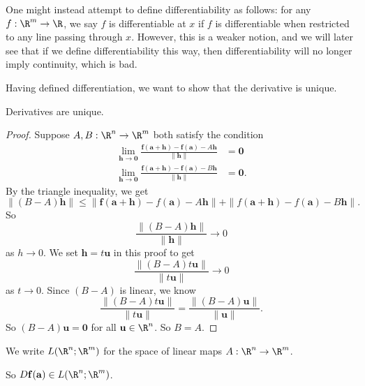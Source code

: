 \documentclass[a4paper]{article}
\begin{document}
One might instead attempt to define differentiability as follows: for any $f: \R^m \to \R$, we say $f$ is differentiable at $x$ if $f$ is differentiable when restricted to any line passing through $x$. However, this is a weaker notion, and we will later see that if we define differentiability this way, then differentiability will no longer imply continuity, which is bad.

Having defined differentiation, we want to show that the derivative is unique.
\begin{prop}
  Derivatives are unique.
\end{prop}

\begin{proof}
  Suppose $A, B: \R^n \to \R^m$ both satisfy the condition
  \begin{align*}
    \lim_{\mathbf{h} \to \mathbf{0}} \frac{\mathbf{f}(\mathbf{a} + \mathbf{h}) - \mathbf{f}(\mathbf{a}) - A \mathbf{h}}{\|\mathbf{h}\|} &= \mathbf{0}\\
    \lim_{\mathbf{h} \to \mathbf{0}} \frac{\mathbf{f}(\mathbf{a} + \mathbf{h}) - \mathbf{f}(\mathbf{a}) - B \mathbf{h}}{\|\mathbf{h}\|} &= \mathbf{0}.
  \end{align*}
  By the triangle inequality, we get
  \[
    \|(B - A) \mathbf{h}\| \leq \|\mathbf{f}(\mathbf{a} + \mathbf{h}) - f(\mathbf{a}) - A\mathbf{h}\| + \|f(\mathbf{a} + \mathbf{h}) - f(\mathbf{a}) - B\mathbf{h}\|.
  \]
  So
  \[
    \frac{\|(B - A)\mathbf{h}\|}{\|\mathbf{h}\|} \to 0
  \]
  as $h \to 0$. We set $\mathbf{h} = t\mathbf{u}$ in this proof to get
  \[
    \frac{\|(B - A) t\mathbf{u}\|}{\|t\mathbf{u}\|} \to 0
  \]
  as $t \to 0$. Since $(B - A)$ is linear, we know
  \[
    \frac{\|(B - A) t\mathbf{u}\|}{\|t\mathbf{u}\|} = \frac{\|(B - A) \mathbf{u}\|}{\|\mathbf{u}\|}.
  \]
  So $(B - A) \mathbf{u} = \mathbf{0}$ for all $\mathbf{u} \in \R^n$. So $B = A$.
\end{proof}

\begin{notation}
  We write $L(\R^n; \R^m)$ for the space of linear maps $A: \R^n \to \R^m$.
\end{notation}
So $D\mathbf{f}(\mathbf{a}) \in L(\R^n; \R^m)$.
\end{document}
